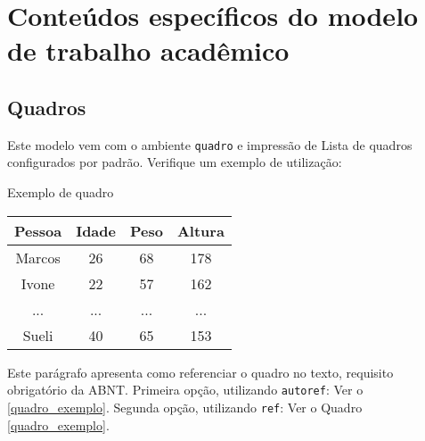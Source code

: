 \chapter{Conteúdos específicos do modelo de trabalho acadêmico}
\label{cap_trabalho_academico}

\section{Quadros}

Este modelo vem com o ambiente \texttt{quadro} e impressão de Lista de quadros
configurados por padrão. Verifique um exemplo de utilização:

\begin{quadro}[htb]
	\caption{\label{quadro_exemplo}Exemplo de quadro}
	\begin{tabular}{|c|c|c|c|}
		\hline
		\textbf{Pessoa} & \textbf{Idade} & \textbf{Peso} & \textbf{Altura} \\ \hline
		Marcos          & 26             & 68            & 178             \\ \hline
		Ivone           & 22             & 57            & 162             \\ \hline
		...             & ...            & ...           & ...             \\ \hline
		Sueli           & 40             & 65            & 153             \\ \hline
	\end{tabular}
\end{quadro}

Este parágrafo apresenta como referenciar o quadro no texto, requisito
obrigatório da ABNT.
Primeira opção, utilizando \texttt{autoref}: Ver o \autoref{quadro_exemplo}.
Segunda opção, utilizando  \texttt{ref}: Ver o Quadro \ref{quadro_exemplo}.